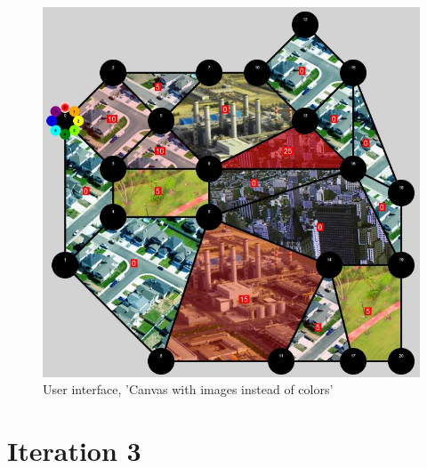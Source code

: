 \begin{figure}[H]
  \centering
    \includegraphics[width=1.0\textwidth]{img/newgraphics.jpg}
  \caption{User interface, 'Canvas with images instead of colors'} 
  \label{fig:newgraphics}
\end{figure}

\section{Iteration 3}

